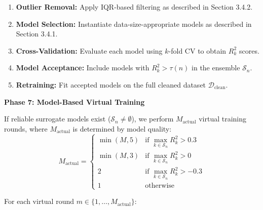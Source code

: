 \documentclass[conference]{IEEEtran}
\begin{document}
\begin{enumerate}
    \item \textbf{Outlier Removal:} Apply IQR-based filtering as described in Section 3.4.2.
    
    \item \textbf{Model Selection:} Instantiate data-size-appropriate models as described in Section 3.4.1.
    
    \item \textbf{Cross-Validation:} Evaluate each model using $k$-fold CV to obtain $R^2_k$ scores.
    
    \item \textbf{Model Acceptance:} Include models with $R^2_k > \tau(n)$ in the ensemble $\mathcal{S}_n$.
    
    \item \textbf{Retraining:} Fit accepted models on the full cleaned dataset $\mathcal{D}_{\text{clean}}$.
\end{enumerate}

\textbf{Phase 7: Model-Based Virtual Training}

If reliable surrogate models exist ($\mathcal{S}_n \neq \emptyset$), we perform $M_{\text{actual}}$ virtual training rounds, where $M_{\text{actual}}$ is determined by model quality:
\begin{equation}
M_{\text{actual}} = \begin{cases}
\min(M, 5) & \text{if } \max_{k \in \mathcal{S}_n} R^2_k > 0.3 \\
\min(M, 3) & \text{if } \max_{k \in \mathcal{S}_n} R^2_k > 0 \\
2 & \text{if } \max_{k \in \mathcal{S}_n} R^2_k > -0.3 \\
1 & \text{otherwise}
\end{cases}
\end{equation}

For each virtual round $m \in \{1, \ldots, M_{\text{actual}}\}$:
\end{document}

